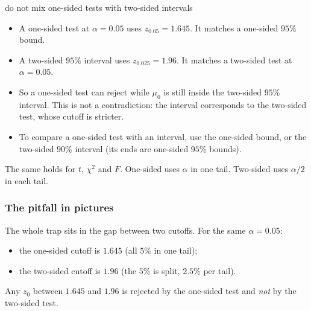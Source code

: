 \begin{pitfall}{do not mix one-sided tests with two-sided intervals}
\begin{itemize}
  \item A one-sided test at $\alpha=0.05$ uses $z_{0.05}=1.645$. It matches a one-sided $95\%$ bound.
  \item A two-sided $95\%$ interval uses $z_{0.025}=1.96$. It matches a two-sided test at $\alpha=0.05$.
  \item So a one-sided test can reject while $\mu_0$ is still inside the two-sided $95\%$ interval. This is not a contradiction: the interval corresponds to the two-sided test, whose cutoff is stricter.
  \item To compare a one-sided test with an interval, use the one-sided bound, or the two-sided $90\%$ interval (its ends are one-sided $95\%$ bounds).
\end{itemize}
The same holds for $t$, $\chi^2$ and $F$. One-sided uses $\alpha$ in one tail. Two-sided uses $\alpha/2$ in each tail.
\end{pitfall}

\subsubsection*{The pitfall in pictures}

The whole trap sits in the gap between two cutoffs. For the same $\alpha=0.05$:
\begin{itemize}
  \item the one-sided cutoff is $1.645$ (all $5\%$ in one tail);
  \item the two-sided cutoff is $1.96$ (the $5\%$ is split, $2.5\%$ per tail).
\end{itemize}
Any $z_0$ between $1.645$ and $1.96$ is rejected by the one-sided test and \emph{not} by the two-sided test.

